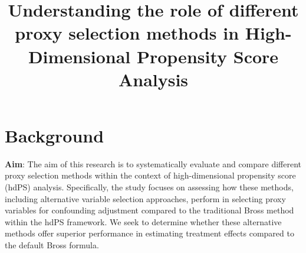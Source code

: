 \documentclass[sn-vancouver,Numbered,lineno,pdflatex]{sn-jnl}
\begin{document}
\title[High-Dimensional Propensity Score]{Understanding the role of
different proxy selection methods in High-Dimensional Propensity Score
Analysis}


\author*[1,2]{   }

\author[3]{  }








\maketitle

\section{Background}\label{background}

\textbf{Aim}: The aim of this research is to systematically evaluate and
compare different proxy selection methods within the context of
high-dimensional propensity score (hdPS) analysis. Specifically, the
study focuses on assessing how these methods, including alternative
variable selection approaches, perform in selecting proxy variables for
confounding adjustment compared to the traditional Bross method within
the hdPS framework. We seek to determine whether these alternative
methods offer superior performance in estimating treatment effects
compared to the default Bross formula.
\end{document}
